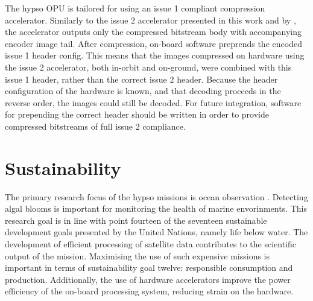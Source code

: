 The \acrshort{hypso} \acrshort{OPU} is tailored for using an issue 1 compliant compression accelerator. Similarly to the issue 2 accelerator presented in this work and by \citeauthor{vorhaugHyperspectralImageCompression2024}, the accelerator outputs only the compressed bitstream body with accompanying encoder image tail. After compression, on-board software preprends the encoded issue 1 header config. This means that the images compressed on hardware using the issue 2 accelerator, both in-orbit and on-ground, were combined with this issue 1 header, rather than the correct issue 2 header. Because the header configuration of the hardware is known, and that decoding proceeds in the reverse order, the images could still be decoded. For future integration, software for prepending the correct header should be written in order to provide compressed bitstreams of full issue 2 compliance.

\section{Sustainability}

The primary research focus of the \acrshort{hypso} missions is ocean observation \cite{grotteOceanColorHyperspectral2022}. Detecting algal blooms is important for monitoring the health of marine envorinments. This research goal is in line with point fourteen of the seventeen sustainable development goals presented by the United Nations, namely life below water. The development of efficient processing of satellite data contributes to the scientific output of the mission. Maximising the use of such expensive missions is important in terms of sustainability goal twelve: responsible consumption and production. Additionally, the use of hardware accelerators improve the power efficiency of the on-board processing system, reducing strain on the hardware.
